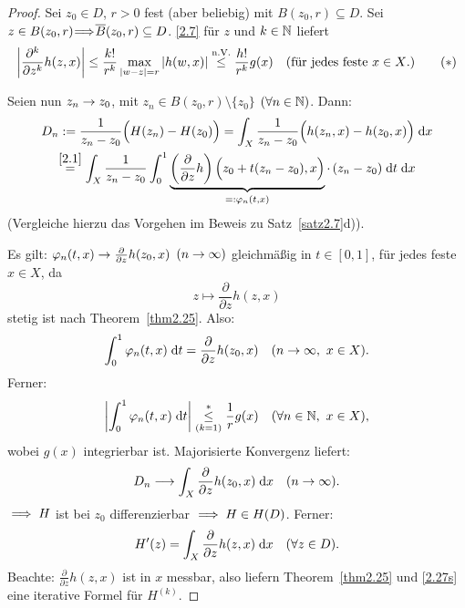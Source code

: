 \documentclass[a4paper,twoside,DIV15,BCOR12mm]{scrbook}
\begin{document}
\begin{proof} Sei $z_0\in D$, $r>0$ fest (aber beliebig) mit $B(z_0,r)\subseteq D$. Sei $z\in B(z_0,r)\!\!\!\implies\!\!\!\overline{B}(z_0,r)\subseteq D$. \eqref{2.7} für $z$ und $k\in\mathbb{N}$ liefert
\[\label{2.27s}\left\lvert\frac{\partial^k}{\partial z^k}h(z,x)\right\lvert\leq \frac{k!}{r^k}\max_{\left\lvert w-z\right\lvert=r}\left\lvert h(w,x)\right\lvert\overset{\text{n.V.}}{\leq}\frac{h!}{r^k}g(x)\quad\text{(für jedes feste $x\in X$.)}\tag{$*$}\]

Seien nun $z_n\rightarrow z_0$, mit $z_n\in B(z_0,r)\setminus\{z_0\}$ $(\forall n\in\mathbb{N})$. Dann:
\begin{gather*}
D_n:= \frac{1}{z_n-z_0}\Bigl(H(z_n)-H(z_0)\Bigr) = \int_{X}^{}{\frac{1}{z_n-z_0}\Bigl(h(z_n,x)-h(z_0,x)\Bigr)}\;\mathrm{d} x\\
\overset{\eqref{2.1}}{=}\int_{X}^{}{\frac{1}{z_n-z_0}\int_{0}^{1}{\underbrace{\left(\frac{\partial}{\partial z}h\right)\Bigl(z_0+t(z_n-z_0),x\Bigr)}_{=:\varphi_n(t,x)}\cdot\,(z_n-z_0)}\;\mathrm{d} t}\;\mathrm{d} x
\end{gather*}
(Vergleiche hierzu das Vorgehen im Beweis zu Satz~\ref{satz2.7}d)).

{Es gilt:} $\varphi_n(t,x)\rightarrow\frac{\partial}{\partial z}h(z_0,x)$ $(n\rightarrow\infty)$ gleichmäßig in $t\in[0,1]$, für jedes feste $x\in X$, da
\[z\mapsto\frac{\partial}{\partial z}h(z,x)\]
stetig ist nach Theorem~\ref{thm2.25}. Also:
\[\int_{0}^{1}{\varphi_n(t,x)}\;\mathrm{d} t=\frac{\partial}{\partial z}h(z_0,x)\quad(n\rightarrow\infty,\ x\in X).\]
Ferner:
\[\abs{\integral{0}{1}{\varphi_n(t,x)}{t}}\overset{*}{\underset{(k=1)}{\leq}}\frac{1}{r}g(x)\quad(\forall\nat{n},\ x\in X),\]
wobei $g(x)$ integrierbar ist.
Majorisierte Konvergenz liefert:
\[D_n\longrightarrow\int_{X}^{}{\frac{\partial}{\partial z}h(z_0,x)}\;\mathrm{d} x\quad(n\rightarrow\infty).\]
$\implies H$ ist bei $z_0$ differenzierbar $\implies H\in H(D)$. Ferner:
\[H^\prime(z) = \int_{X}^{}{\frac{\partial}{\partial z}h(z,x)}\;\mathrm{d} x\quad(\forall z\in D).\]
Beachte: $\frac{\partial}{\partial z}h(z,x)$ ist in $x$ messbar, also liefern Theorem~\ref{thm2.25} und \eqref{2.27s} eine iterative Formel für $H^{(k)}$.
\end{proof}
\end{document}
